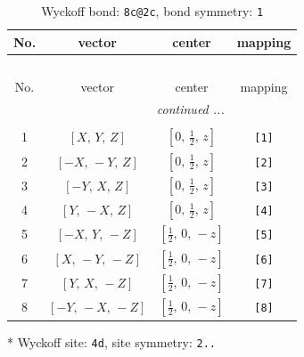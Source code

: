 \documentclass[fleqn,8pt]{jsarticle}
\begin{document}
\begin{longtable}{cccc}
\caption{Wyckoff bond: {\tt 8c@2c}, bond symmetry: {\tt 1}}
 \\
 \hline \hline
No. & vector & center & mapping \\ \hline \endfirsthead

\multicolumn{3}{l}{\tablename\ \thetable{}} \\
 \hline \hline
No. & vector & center & mapping \\ \hline \endhead

 \hline \hline
\multicolumn{3}{r}{\footnotesize\it continued ...} \\ \endfoot

 \hline \hline
\multicolumn{3}{r}{} \\ \endlastfoot

1 & $\left[ X,\, Y,\, Z \right]$ & $\left[ 0,\, \frac{1}{2},\, z \right]$ & {\tt [1]} \\ \hline
2 & $\left[ - X,\, - Y,\, Z \right]$ & $\left[ 0,\, \frac{1}{2},\, z \right]$ & {\tt [2]} \\ \hline
3 & $\left[ - Y,\, X,\, Z \right]$ & $\left[ 0,\, \frac{1}{2},\, z \right]$ & {\tt [3]} \\ \hline
4 & $\left[ Y,\, - X,\, Z \right]$ & $\left[ 0,\, \frac{1}{2},\, z \right]$ & {\tt [4]} \\ \hline
5 & $\left[ - X,\, Y,\, - Z \right]$ & $\left[ \frac{1}{2},\, 0,\, - z \right]$ & {\tt [5]} \\ \hline
6 & $\left[ X,\, - Y,\, - Z \right]$ & $\left[ \frac{1}{2},\, 0,\, - z \right]$ & {\tt [6]} \\ \hline
7 & $\left[ Y,\, X,\, - Z \right]$ & $\left[ \frac{1}{2},\, 0,\, - z \right]$ & {\tt [7]} \\ \hline
8 & $\left[ - Y,\, - X,\, - Z \right]$ & $\left[ \frac{1}{2},\, 0,\, - z \right]$ & {\tt [8]} \\
\end{longtable}
* Wyckoff site: {\tt 4d}, site symmetry: {\tt 2..}
\renewcommand{\arraystretch}{1.2}
\end{document}
